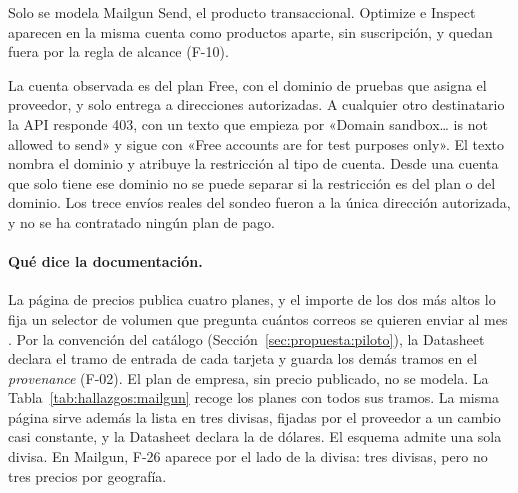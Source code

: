 Solo se modela Mailgun Send, el producto transaccional. Optimize e Inspect aparecen en la misma cuenta como
productos aparte, sin suscripción, y quedan fuera por la regla de alcance
(F-10).

La cuenta observada es del plan Free, con el dominio de pruebas que
asigna el proveedor, y solo entrega a direcciones autorizadas. A cualquier otro
destinatario la API responde 403, con un texto que empieza por «Domain sandbox…
is not allowed to send» y sigue con «Free accounts are for test purposes only».
El texto nombra el dominio y atribuye la restricción al tipo de cuenta. Desde
una cuenta que solo tiene ese dominio no se puede separar si la restricción es del plan o del dominio. Los trece envíos reales del sondeo fueron
a la única dirección autorizada, y no se ha contratado ningún plan de pago.

\paragraph{Qué dice la documentación.} La página de precios publica cuatro
planes, y el importe de los dos más altos lo fija un selector de volumen que
pregunta cuántos correos se quieren enviar al mes \citep{mailgunpricing}. Por la convención del catálogo (Sección~\ref{sec:propuesta:piloto}), la Datasheet declara el tramo de entrada de cada tarjeta y guarda los demás tramos en el \textit{provenance} (F-02). El plan de empresa, sin precio publicado, no se
modela. La Tabla~\ref{tab:hallazgos:mailgun} recoge los planes con todos sus tramos. La misma página sirve además la lista en tres divisas, fijadas por el
proveedor a un cambio casi constante, y la Datasheet declara la de dólares. El esquema admite una sola divisa. En Mailgun, F-26 aparece por el lado de la divisa: tres divisas, pero no tres precios por geografía.

